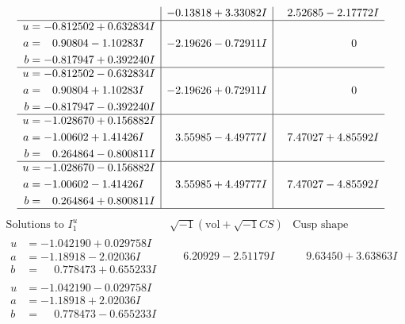 \documentclass[1p]{elsarticle_modified}
\theoremstyle{definition}
\newcommand{\I}{\sqrt{-1}}
\begin{document}
$$\begin{array}{c|c|c}
 & -0.13818 + 3.33082 I & \phantom{-}2.52685 - 2.17772 I \\ \hline\begin{aligned}
u &= -0.812502 + 0.632834 I \\
a &= \phantom{-}0.90804 - 1.10283 I \\
b &= -0.817947 + 0.392240 I\end{aligned}
 & -2.19626 - 0.72911 I & \phantom{-0.000000 } 0 \\ \hline\begin{aligned}
u &= -0.812502 - 0.632834 I \\
a &= \phantom{-}0.90804 + 1.10283 I \\
b &= -0.817947 - 0.392240 I\end{aligned}
 & -2.19626 + 0.72911 I & \phantom{-0.000000 } 0 \\ \hline\begin{aligned}
u &= -1.028670 + 0.156882 I \\
a &= -1.00602 + 1.41426 I \\
b &= \phantom{-}0.264864 - 0.800811 I\end{aligned}
 & \phantom{-}3.55985 - 4.49777 I & \phantom{-}7.47027 + 4.85592 I \\ \hline\begin{aligned}
u &= -1.028670 - 0.156882 I \\
a &= -1.00602 - 1.41426 I \\
b &= \phantom{-}0.264864 + 0.800811 I\end{aligned}
 & \phantom{-}3.55985 + 4.49777 I & \phantom{-}7.47027 - 4.85592 I\\
 \hline 
 \end{array}$$\newpage$$\begin{array}{c|c|c}  
\text{Solutions to }I^u_{1}& \I (\text{vol} + \sqrt{-1}CS) & \text{Cusp shape}\\
 \hline 
\begin{aligned}
u &= -1.042190 + 0.029758 I \\
a &= -1.18918 - 2.02036 I \\
b &= \phantom{-}0.778473 + 0.655233 I\end{aligned}
 & \phantom{-}6.20929 - 2.51179 I & \phantom{-}9.63450 + 3.63863 I \\ \hline\begin{aligned}
u &= -1.042190 - 0.029758 I \\
a &= -1.18918 + 2.02036 I \\
b &= \phantom{-}0.778473 - 0.655233 I\end{aligned}

\end{array}$$
\end{document}
